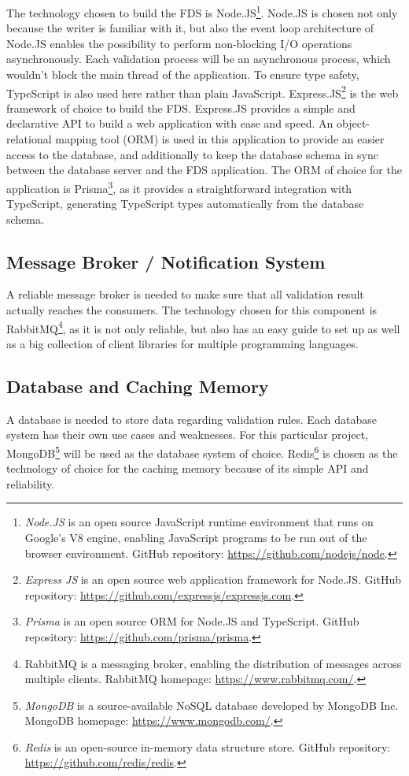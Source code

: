  The technology chosen to build the FDS is Node.JS\footnote{\emph{Node.JS} is an open source JavaScript runtime environment that runs on Google's V8 engine, enabling JavaScript programs to be run out of the browser environment. GitHub repository: \url{https://github.com/nodejs/node}.}. Node.JS is chosen not only because the writer is familiar with it, but also the event loop architecture of Node.JS enables the possibility to perform non-blocking I/O operations asynchronously. Each validation process will be an asynchronous process, which wouldn't block the main thread of the application. To ensure type safety, TypeScript is also used here rather than plain JavaScript. Express.JS\footnote{\emph{Express JS} is an open source web application framework for Node.JS. GitHub repository: \url{https://github.com/expressjs/expressjs.com}.} is the web framework of choice to build the FDS. Express.JS provides a simple and declarative API to build a web application with ease and speed.
An object-relational mapping tool (ORM) is used in this application to provide an easier access to the database, and additionally to keep the database schema in sync between the database server and the FDS application. The ORM of choice for the application is Prisma\footnote{\emph{Prisma} is an open source ORM for Node.JS and TypeScript. GitHub repository: \url{https://github.com/prisma/prisma}.}, as it provides a straightforward integration with TypeScript, generating TypeScript types automatically from the database schema.

 \subsection{Message Broker / Notification System}
 A reliable message broker is needed to make sure that all validation result actually reaches the consumers. The technology chosen for this component is RabbitMQ\footnote{RabbitMQ is a messaging broker, enabling the distribution of messages across multiple clients. RabbitMQ homepage: \url{https://www.rabbitmq.com/}.}, as it is not only reliable, but also has an easy guide to set up as well as a big collection of client libraries for multiple programming languages.

 \subsection{Database and Caching Memory}
 A database is needed to store data regarding validation rules. Each database system has their own use cases and weaknesses. For this particular project, MongoDB\footnote{\emph{MongoDB} is a source-available NoSQL database developed by MongoDB Inc. MongoDB homepage: \url{https://www.mongodb.com/}.} will be used as the database system of choice. Redis\footnote{\emph{Redis} is an open-source in-memory data structure store. GitHub repository: \url{https://github.com/redis/redis}.} is chosen as the technology of choice for the caching memory because of its simple API and reliability. 